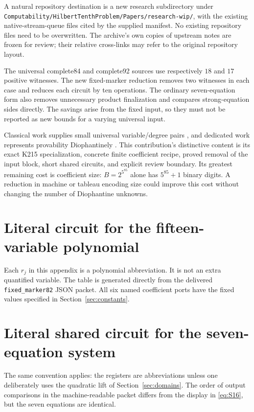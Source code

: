 \documentclass[11pt,a4paper]{article}
\theoremstyle{remark}
\newcommand{\code}[1]{\nolinkurl{#1}}
\begin{document}
A natural repository destination is a new research subdirectory under
\code{Computability/HilbertTenthProblem/Papers/research-wip/}, with
the existing native-stream-queue files cited by the supplied manifest.
No existing repository files need to be overwritten. The archive's
own copies of upstream notes are frozen for review; their relative
cross-links may refer to the original repository layout.

The universal complete84 and complete92 sources use respectively
$18$ and $17$ positive witnesses. The new fixed-marker reduction
removes two witnesses in each case and reduces each circuit by ten
operations. The ordinary seven-equation form also removes unnecessary
product finalization and compares strong-equation sides directly.
The savings arise from the fixed input, so they must not be reported
as new bounds for a varying universal input.

Classical work supplies small universal variable/degree pairs
\cite{jones1982}, and dedicated work represents provability
Diophantinely \cite{carlmoroz}. This contribution's distinctive content
is its exact K215 specialization, concrete finite coefficient recipe,
proved removal of the input block, short shared circuits, and explicit
review boundary. Its greatest remaining cost is coefficient size:
$B=2^{5^{85}}$ alone has $5^{85}+1$ binary digits. A reduction in
machine or tableau encoding size could improve this cost without
changing the number of Diophantine unknowns.

\clearpage
\appendix
\section{Literal circuit for the fifteen-variable polynomial}

Each $r_j$ in this appendix is a polynomial abbreviation. It is not an
extra quantified variable. The table is generated directly from the
delivered \code{fixed_marker82} JSON packet. All six named coefficient
ports have the fixed values specified in Section~\ref{sec:constants}.

\begingroup\small

\endgroup

\clearpage
\section{Literal shared circuit for the seven-equation system}

The same convention applies: the registers are abbreviations unless
one deliberately uses the quadratic lift of Section~\ref{sec:domains}.
The order of output comparisons in the machine-readable packet differs
from the display in \eqref{eq:S16}, but the seven equations are identical.
\end{document}
